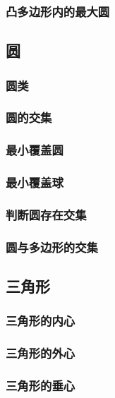 \documentclass[a4paper]{article}
\begin{document}
\subsubsection{凸多边形内的最大圆}

\subsection{圆}

\subsubsection{圆类}

\subsubsection{圆的交集}

\subsubsection{最小覆盖圆}

\subsubsection{最小覆盖球}

\subsubsection{判断圆存在交集}

\subsubsection{圆与多边形的交集}

\subsection{三角形}

\subsubsection{三角形的内心}

\subsubsection{三角形的外心}

\subsubsection{三角形的垂心}
\end{document}
